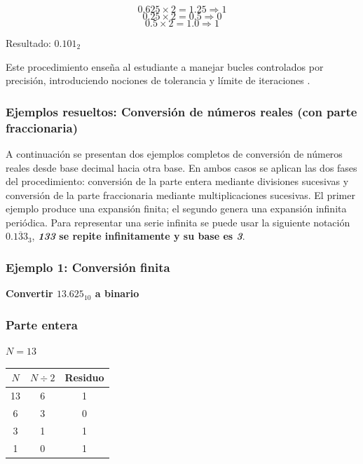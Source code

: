 \documentclass[12pt,twoside]{book}
\begin{document}
						\[
						0.625 \times 2 = 1.25 \Rightarrow 1
						\]
						\[
						0.25 \times 2 = 0.5 \Rightarrow 0
						\]
						\[
						0.5 \times 2 = 1.0 \Rightarrow 1
						\]
						
						\noindent
						Resultado: $0.101_2$
						
						Este procedimiento enseña al estudiante a manejar bucles controlados por precisión, introduciendo nociones de tolerancia y límite de iteraciones \cite{Hanly2015Problem,Gaddis2022Starting,Chapra2014Numerical}.
						
						\subsubsection*{Ejemplos resueltos: Conversión de números reales (con parte fraccionaria)}
						
						\noindent
						A continuación se presentan dos ejemplos completos de conversión de números reales desde base decimal hacia otra base. En ambos casos se aplican las dos fases del procedimiento: conversión de la parte entera mediante divisiones sucesivas y conversión de la parte fraccionaria mediante multiplicaciones sucesivas. El primer ejemplo produce una expansión finita; el segundo genera una expansión infinita periódica. Para representar una serie infinita se puede usar la siguiente notación $0.\overline{133}_3$, \textbf{\textit{133} se repite infinitamente y su base es \textit{3}}.
						
						\subsubsection*{Ejemplo 1: Conversión finita}
						\noindent
						\textbf{Convertir $13.625_{10}$ a binario}
						
						\subsubsection*{Parte entera}
						
						\noindent
						$N = 13$
						
						\begin{center}
							\begin{tabular}{c|c|c}
								$N$ & $N \div 2$ & Residuo \\
								\hline
								13 & 6 & 1 \\
								6  & 3 & 0 \\
								3  & 1 & 1 \\
								1  & 0 & 1 \\
							\end{tabular}
						\end{center}
						
\end{document}

